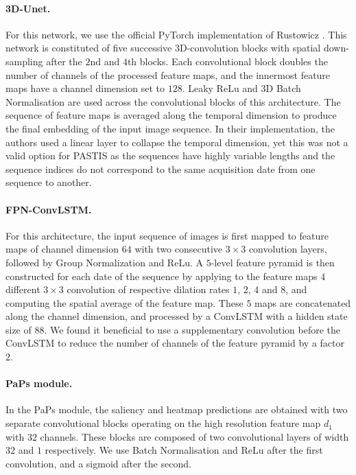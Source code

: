 \paragraph{3D-Unet.} 
For this network, we use the official PyTorch implementation of Rustowicz \etal \cite{m2019semantic}. This network is constituted of 
five successive 3D-convolution blocks with spatial down-sampling after the $2$nd and $4$th blocks. Each convolutional block doubles the number of channels of the processed feature maps, and the innermost feature maps have a channel dimension set to $128$. Leaky ReLu and 3D Batch Normalisation are used across the convolutional blocks of this architecture. The sequence of feature maps is averaged along the temporal dimension to produce the final embedding of the input image sequence. In their implementation, the authors used a linear layer to collapse the temporal dimension, yet this was not a valid option for PASTIS as the sequences have highly variable lengths and
the sequence indices do not correspond to the same acquisition date from one sequence to another.


\paragraph{FPN-ConvLSTM.} 
For this architecture, the input sequence of images is first mapped to feature maps of channel dimension $64$ with two consecutive $3\times3$ convolution layers, followed by Group Normalization and ReLu. A $5$-level feature pyramid is then constructed for each date of the sequence
by applying to the feature maps $4$ different $3\times3$ convolution of respective dilation rates $1$, $2$, $4$ and $8$, and computing the spatial average of the feature map.
These $5$ maps are concatenated along the channel dimension, and processed by a ConvLSTM with a hidden state size of $88$. We found it beneficial to use a supplementary convolution before the ConvLSTM to reduce the number of channels of the feature pyramid by a factor $2$.



\paragraph{PaPs module.} In the PaPs module, the saliency and heatmap predictions are obtained with two separate convolutional blocks operating on the high resolution feature map $d_1$ with $32$ channels. These blocks are composed of two convolutional layers
of width $32$ and $1$  respectively. We use Batch Normalisation and ReLu after the first convolution, and a sigmoid after the second.


